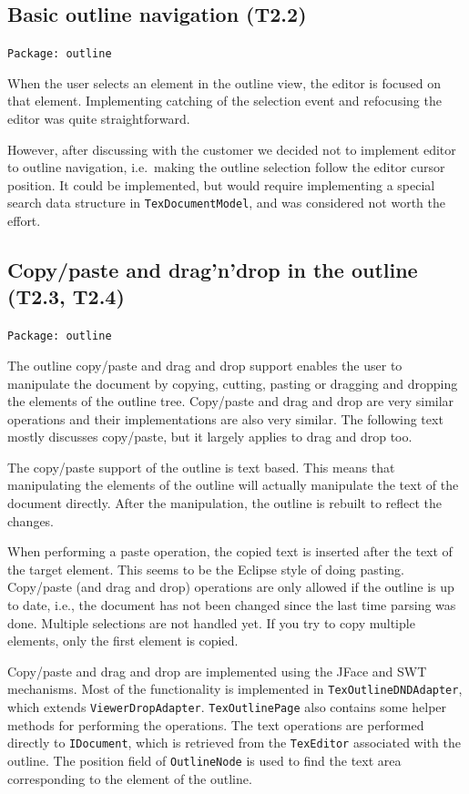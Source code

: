 \documentclass[a4paper,11pt,twoside]{article}
\begin{document}
\subsection{Basic outline navigation (T2.2)}

\texttt{Package: outline}

When the user selects an element in the outline view, the editor is focused on 
that element. Implementing catching of the selection event and refocusing the
editor was quite straightforward.

However, after discussing with the customer we decided not to implement editor 
to outline navigation, i.e.\ making the outline selection follow the editor 
cursor position. It could be implemented, but would require implementing a 
special search data structure in \texttt{TexDocumentModel}, and was considered 
not worth the effort.


\subsection{Copy/paste and drag'n'drop in the outline (T2.3, T2.4)}
\label{sect:t2.3}

\texttt{Package: outline}

The outline copy/paste and drag and drop support enables the user to manipulate 
the document by copying, cutting, pasting or dragging and dropping the elements 
of the outline tree. Copy/paste and drag and drop are very similar operations
and their implementations are also very similar. The following text mostly 
discusses copy/paste, but it largely applies to drag and drop too.

The copy/paste support of the outline is text based. This means that 
manipulating the elements of the outline will actually manipulate the text of 
the document directly. After the manipulation, the outline is rebuilt to 
reflect the changes.

When performing a paste operation, the copied text is inserted after the text of 
the target element. This seems to be the Eclipse style of doing pasting. 
Copy/paste (and drag and drop) operations are only allowed if the outline is 
up to date, i.e., the document has not been changed since the last time parsing
was done. Multiple selections are not handled yet. If you try to copy multiple 
elements, only the first element is copied.

Copy/paste and drag and drop are implemented using the JFace and SWT 
mechanisms. Most of the functionality is implemented in 
\texttt{TexOutlineDNDAdapter}, which extends \texttt{ViewerDropAdapter}. 
\texttt{TexOutlinePage} also contains some helper methods for performing the 
operations. The text operations are performed directly to \texttt{IDocument}, 
which is retrieved from the \texttt{TexEditor} associated with the outline. The 
position field of \texttt{OutlineNode} is used to find the text area 
corresponding to the element of the outline.
\end{document}
